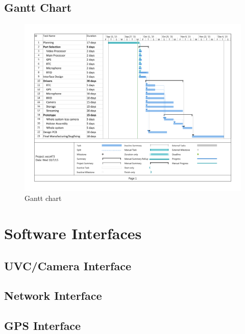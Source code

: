 \documentclass[12pt]{article}
\begin{document}
\begin{landscape}
    \section{Gantt Chart}
    \label{app:gantt}
    \thispagestyle{empty}

    \begin{figure}[h!]
        \centering
        \includegraphics[width=1.1\textwidth]{gantt}
        \caption{Gantt chart}
        \label{fig:gantt}
    \end{figure}
\end{landscape}

\newpage

\section{Software Interfaces}
\label{app:software_interfaces}

\subsection{UVC/Camera Interface}


\newpage

\subsection{Network Interface}


\newpage

\subsection{GPS Interface}

\end{document}
